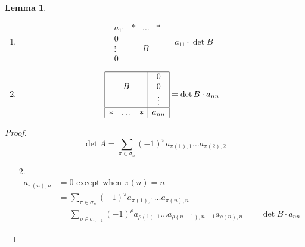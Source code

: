 \documentclass[a4paper,landscape,twocolumn]{article}
\newtheorem{lemma}{Lemma}
\begin{document}
\begin{lemma}
  \label{lemma-7.35}
  \begin{enumerate}
    \item
      \[
        \begin{array}{|c|ccc|}
          \hline
            a_{11} & * & \ldots & * \\
          \hline
            0      &   &        &  \\
            \vdots &   &  B     &  \\
            0      &   &        &
        \end{array}
        = a_{11} \cdot \det{B}
      \]
    \item
      \[
        \begin{array}{|ccc|c|}
          \hline
                &        &   & 0 \\
                & B      &   & 0  \\
                &        &   & \vdots \\
          \hline
            *   & \ldots & * & a_{nn}
        \end{array}
        = \det{B} \cdot a_{nn}
      \]
  \end{enumerate}
\end{lemma}

\begin{proof}
  \[ \det{A} = \sum_{\pi \in \sigma_n} (-1)^\pi a_{\pi(1),1} \ldots a_{\pi(2),2} \]

  \begin{enumerate}
    \item[2.]
      \begin{align*}
        a_{\pi(n),n} &= 0 \text{ except when } \pi(n) = n \\
          &= \sum_{\pi \in \sigma_n} (-1)^\pi a_{\pi(1),1} \ldots a_{\pi(n),n} \\
          &= \sum_{\rho \in \sigma_{n-1}} (-1)^\rho a_{\rho(1),1} \ldots a_{\rho(n-1),n-1} a_{\rho(n),n}
          &= \det{B} \cdot a_{nn}
      \end{align*}
  \end{enumerate}
\end{proof}
\end{document}
